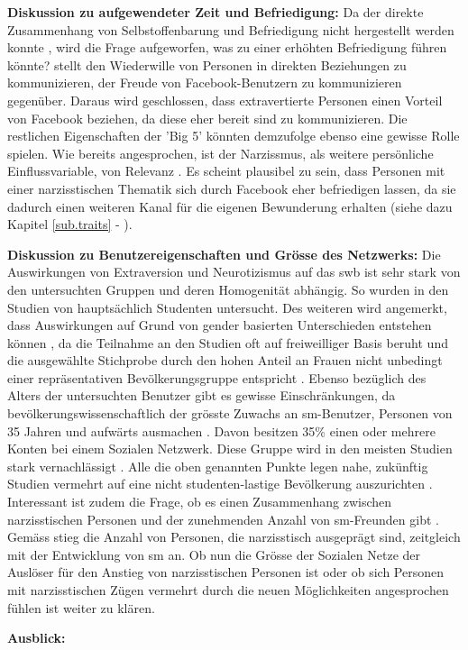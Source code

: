 \textbf{Diskussion zu aufgewendeter Zeit und Befriedigung:}\newline
Da der direkte Zusammenhang von Selbstoffenbarung und Befriedigung nicht hergestellt werden konnte \cite{Special:2012}, wird die Frage aufgeworfen, was zu einer erhöhten Befriedigung führen könnte?  stellt den Wiederwille von Personen in direkten Beziehungen zu kommunizieren, der Freude von Facebook-Benutzern zu kommunizieren gegenüber. Daraus wird geschlossen, dass extravertierte Personen einen Vorteil von Facebook beziehen, da diese eher bereit sind zu kommunizieren. Die restlichen Eigenschaften der 'Big 5' könnten demzufolge ebenso eine gewisse Rolle spielen.\newline
Wie bereits angesprochen, ist der Narzissmus, als weitere persönliche Einflussvariable, von Relevanz \cite{Special:2012}. Es scheint plausibel zu sein, dass Personen mit einer narzisstischen Thematik sich durch Facebook eher befriedigen lassen, da sie dadurch einen weiteren Kanal für die eigenen Bewunderung erhalten (siehe dazu Kapitel \ref{sub.traits} - ).\par 

\textbf{Diskussion zu Benutzereigenschaften und Grösse des Netzwerks:}\newline
Die Auswirkungen von Extraversion und Neurotizismus auf das \gls{swb} ist sehr stark von den untersuchten Gruppen und deren Homogenität abhängig. So wurden in den Studien von  hauptsächlich Studenten untersucht. Des weiteren wird angemerkt, dass Auswirkungen auf Grund von gender basierten Unterschieden entstehen können \cite{Special:2012}, da die Teilnahme an den Studien oft auf freiweilliger Basis beruht und die ausgewählte Stichprobe durch den hohen Anteil an Frauen nicht unbedingt einer repräsentativen Bevölkerungsgruppe entspricht \cite{Manago:2012}. Ebenso bezüglich des Alters der untersuchten Benutzer gibt es gewisse Einschränkungen, da bevölkerungswissenschaftlich der grösste Zuwachs an \gls{sm}-Benutzer, Personen von 35 Jahren und aufwärts ausmachen \cite{Lenhart:2009}. Davon besitzen 35\%  einen oder mehrere Konten bei einem Sozialen Netzwerk. Diese Gruppe wird in den meisten Studien stark vernachlässigt \cite{Special:2012}. Alle die oben genannten Punkte legen nahe, zukünftig Studien vermehrt auf eine nicht studenten-lastige Bevölkerung auszurichten \cite{Kim:2011}. Interessant ist zudem die Frage, ob es einen Zusammenhang zwischen narzisstischen Personen und der zunehmenden Anzahl von \gls{sm}-Freunden gibt \cite{Manago:2012}. Gemäss  stieg die Anzahl von Personen, die narzisstisch ausgeprägt sind, zeitgleich mit der Entwicklung von \gls{sm} an. Ob nun die Grösse der Sozialen Netze der Auslöser für den Anstieg von narzisstischen Personen ist \cite{Manago:2012} oder ob sich Personen mit narzisstischen Zügen vermehrt durch die neuen Möglichkeiten angesprochen fühlen \cite{Carpenter:2012} ist weiter zu klären. \par 
\textbf{Ausblick:}\newline

